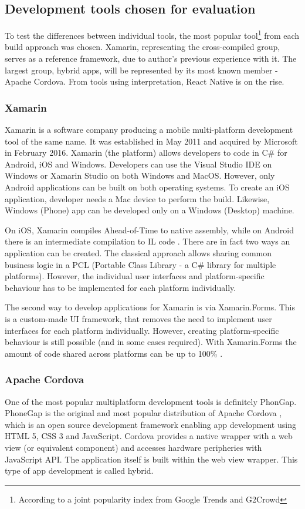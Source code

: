 \documentclass[english,master,public,dept460,male,cpdeclaration,oneside]{diploma}
\begin{document}
\subsection{Development tools chosen for evaluation}
To test the differences between individual tools, the most popular tool\footnote{According to a joint popularity index from Google Trends and G2Crowd} from each build approach was chosen. Xamarin, representing the cross-compiled group, serves as a reference framework, due to author’s previous experience with it. The largest group, hybrid apps, will be represented by its most known member - Apache Cordova. From tools using interpretation, React Native is on the rise.

\subsubsection{Xamarin}
Xamarin is a software company producing a mobile multi-platform development tool of the same name. It was established in May 2011 and acquired by Microsoft in February 2016. Xamarin (the platform) allows developers to code in C\# for Android, iOS and Windows. Developers can use the Visual Studio IDE on Windows or Xamarin Studio on both Windows and MacOS. However, only Android applications can be built on both operating systems. To create an iOS application, developer needs a Mac device to perform the build. Likewise, Windows (Phone) app can be developed only on a Windows (Desktop) machine. 

On iOS, Xamarin compiles Ahead-of-Time to native assembly, while on Android there is an intermediate compilation to IL code \cite{xamarin}. There are in fact two ways an application can be created. The classical approach allows sharing common business logic in a PCL (Portable Class Library - a C\# library for multiple platforms). However, the individual user interfaces and platform-specific behaviour has to be implemented for each platform individually. 

The second way to develop applications for Xamarin is via Xamarin.Forms. This is a custom-made UI framework, that removes the need to implement user interfaces for each platform individually. However, creating platform-specific behaviour is still possible (and in some cases required). With Xamarin.Forms the amount of code shared across platforms can be up to 100\% \cite{xamarin}.

\subsubsection{Apache Cordova}
One of the most popular multiplatform development tools is definitely PhonGap. PhoneGap is the original and most popular distribution of Apache Cordova \cite{apacheCordova}, which is an open source development framework enabling app development using HTML 5, CSS 3 and JavaScript. Cordova provides a native wrapper with a web view (or equivalent component) and accesses hardware peripheries with JavaScript API. The application itself is built within the web view wrapper. This type of app development is called hybrid. 
\end{document}

